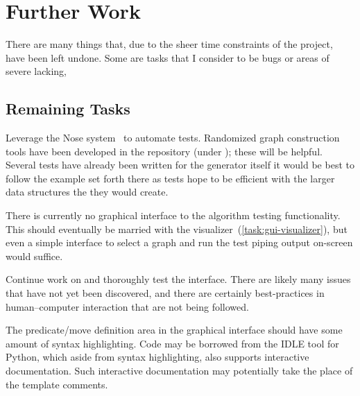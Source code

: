 \section{Further Work}
\label{sec:further-work}

There are many things that, due to the sheer time constraints of the project,
  have been left undone.
Some are tasks that I consider to be bugs or areas of severe lacking,

\subsection{Remaining Tasks}
\label{sec:tasks:bugs}

\begin{task}
  \label{task:test}
  Leverage the Nose system~\autocite{nose} to automate tests.
  Randomized graph construction tools have been developed in the repository
    (under );
  these will be helpful.
  Several tests have already been written for the generator itself \Dash
    it would be best to follow the example set forth there as tests hope to be
    efficient with the larger data structures the they would create.
\end{task}

\begin{task}
  \label{task:testing-interface}
  There is currently no graphical interface to the algorithm testing functionality.
  This should eventually be married with the visualizer~(\autoref{task:gui-visualizer}),
    but even a simple interface to select a graph and run the test \Dash
    piping output on-screen \Dash would suffice.
\end{task}

\begin{task}
  \label{task:interface}
  Continue work on and thoroughly test the interface.
  There are likely many issues that have not yet been discovered,
    and there are certainly best-practices in human--computer interaction
    that are not being followed.
\end{task}

\begin{task}
  \label{task:gui-syntax-highlighting}
  The predicate\slash move definition area in the graphical interface
    should have some amount of syntax highlighting.
  Code may be borrowed from the IDLE tool for Python,
    which aside from syntax highlighting, also supports interactive documentation.
  Such interactive documentation may potentially take the place of the template comments.
\end{task}

